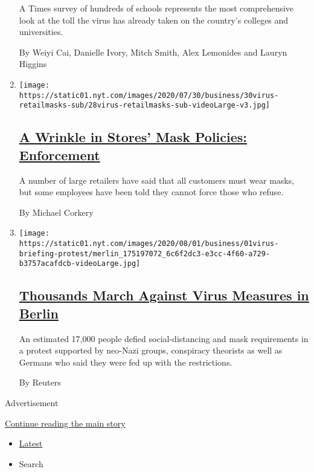 \begin{enumerate}
  A Times survey of hundreds of schools represents the most
  comprehensive look at the toll the virus has already taken on the
  country's colleges and universities.

  By Weiyi Cai, Danielle Ivory, Mitch Smith, Alex Lemonides and Lauryn
  Higgins
\item
  \texttt{[image: https://static01.nyt.com/images/2020/07/30/business/30virus-retailmasks-sub/28virus-retailmasks-sub-videoLarge-v3.jpg]}

  \hypertarget{a-wrinkle-in-stores-mask-policies-enforcement}{%
  \subsection{\texorpdfstring{\href{/2020/07/29/business/coronavirus-masks-stores-walmart.html}{A
  Wrinkle in Stores' Mask Policies:
  Enforcement}}{A Wrinkle in Stores' Mask Policies: Enforcement}}\label{a-wrinkle-in-stores-mask-policies-enforcement}}

  A number of large retailers have said that all customers must wear
  masks, but some employees have been told they cannot force those who
  refuse.

  By Michael Corkery
\item
  \texttt{[image: https://static01.nyt.com/images/2020/08/01/business/01virus-briefing-protest/merlin\_175197072\_6c6f2dc3-e3cc-4f60-a729-b3757acafdcb-videoLarge.jpg]}

  \hypertarget{thousands-march-against-virus-measures-in-berlin}{%
  \subsection{\texorpdfstring{\href{/video/world/europe/100000007268465/coronavirus-protest-germany.html}{Thousands
  March Against Virus Measures in
  Berlin}}{Thousands March Against Virus Measures in Berlin}}\label{thousands-march-against-virus-measures-in-berlin}}

  An estimated 17,000 people defied social-distancing and mask
  requirements in a protest supported by neo-Nazi groups, conspiracy
  theorists as well as Germans who said they were fed up with the
  restrictions.

  By Reuters
\end{enumerate}

Advertisement

\protect\hyperlink{after-mid2}{Continue reading the main story}

\begin{itemize}
\tightlist
\item
  \protect\hyperlink{stream-panel}{Latest}
\item
  Search
\end{itemize}

